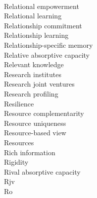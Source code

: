 \documentclass[a4paper]{article}
\begin{document}
\begin{multicols*}{2}
\begin{footnotesize}
\\ Relational empowerment \\ Relational learning \\ Relationship commitment \\ Relationship learning \\ Relationship-specific memory \\ Relative absorptive capacity \\ Relevant knowledge \\ Research institutes \\ Research joint ventures \\ Research profiling \\ Resilience \\ Resource complementarity \\ Resource uniqueness \\ Resource-based view \\ Resources \\ Rich information \\ Rigidity \\ Rival absorptive capacity \\ Rjv \\ Ro
\end{footnotesize}
\end{multicols*}
\end{document}
